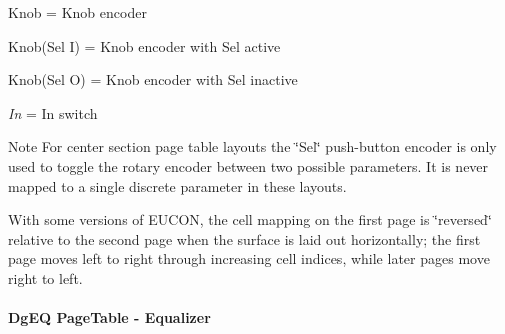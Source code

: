 \begin{DoxyItemize}
\item Knob = Knob encoder  
\item Knob(\+Sel I) = Knob encoder with Sel active  
\item Knob(\+Sel O) = Knob encoder with Sel inactive  
\item {\itshape In} = In switch  
\end{DoxyItemize}

\begin{DoxyNote}{Note}
For center section page table layouts the \char`\"{}\+Sel\char`\"{} push-\/button encoder is only used to toggle the rotary encoder between two possible parameters. It is never mapped to a single discrete parameter in these layouts.

With some versions of E\+U\+C\+O\+N, the cell mapping on the first page is \char`\"{}reversed\char`\"{} relative to the second page when the surface is laid out horizontally; the first page moves left to right through increasing cell indices, while later pages move right to left.
\end{DoxyNote}
\hypertarget{a00363_aax_page_table_guide_04_avid_center_section_page_tables_eucon_mapping_DgEQ}{}\paragraph{\textquotesingle{}\+Dg\+E\+Q\textquotesingle{} Page\+Table -\/ Equalizer}\label{a00363_aax_page_table_guide_04_avid_center_section_page_tables_eucon_mapping_DgEQ}
